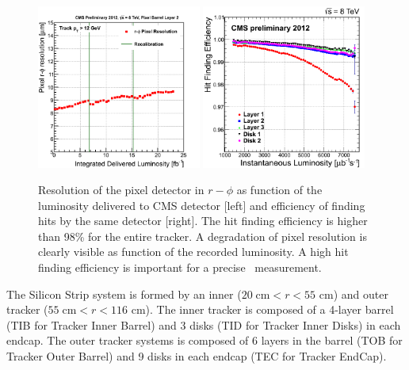 \begin{figure}[!Hhtbp]
  \begin{center}
    \includegraphics[width=0.48\textwidth]{figs/PXB2_residuals.png}
    \includegraphics[width=0.48\textwidth]{figs/HitEff_vs_InstLumi.png}
    \caption{Resolution of the pixel detector in $r-\phi$ as function of the luminosity delivered to CMS detector [left] and efficiency of finding hits by the same detector [right]. The hit finding efficiency is higher than 98\% for the entire tracker. A degradation of pixel resolution is clearly visible as function of the recorded luminosity. A high hit finding efficiency is important for a precise \pt~measurement.}
    \label{fig:pixelresolution}
  \end{center}
\end{figure}

The Silicon Strip system is formed by an inner ($20\;\text{cm} < r < 55$ cm) and outer tracker ($55\;\text{cm} < r < 116$ cm). The inner tracker is composed of a 4-layer barrel (TIB for Tracker Inner Barrel) and 3 disks (TID for Tracker Inner Disks) in each endcap. The outer tracker systems is composed of 6 layers in the barrel (TOB for Tracker Outer Barrel) and 9 disks in each endcap (TEC for Tracker EndCap).

